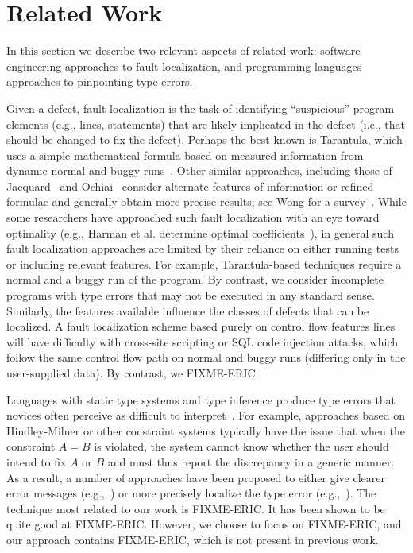 \section{Related Work}
\label{sec:related-work}

In this section we describe two relevant aspects of related work:
software engineering approaches to fault localization, and 
programming languages approaches to pinpointing type errors. 

Given a defect, fault localization is the task of identifying
``suspicious'' program elements (e.g., lines, statements) that are likely
implicated in the defect (i.e., that should be changed to fix the defect). 
Perhaps the best-known is Tarantula, which uses a simple mathematical
formula based on measured information from dynamic normal and buggy
runs~\cite{FIXME}. Other similar approaches, including those of
Jacquard~\cite{FIXME} and Ochiai~\cite{FIXME} consider alternate features
of information or refined formulae and generally obtain more precise
results; see Wong for a survey~\cite{FIXME}. While some researchers have
approached such fault localization with an eye toward optimality (e.g.,
Harman et al. determine optimal coefficients~\cite{FIXME}), in general
such fault localization approaches are limited by their reliance on either
running tests or including relevant features. For example, Tarantula-based 
techniques require a normal and a buggy run of the program. By contrast,
we consider incomplete programs with type errors that may not be executed
in any standard sense. Similarly, the features available influence the
classes of defects that can be localized. A fault localization scheme based
purely on control flow features lines will have difficulty with cross-site
scripting or SQL code injection attacks, which follow the same control flow
path on normal and buggy runs (differing only in the user-supplied data).
By contrast, we FIXME-ERIC.

Languages with static type systems and type inference produce type errors
that novices often perceive as difficult to interpret~\cite{FIXME}.  For
example, approaches based on Hindley-Milner or other constraint systems 
typically have the issue that when the constraint $A=B$ is violated, 
the system cannot know whether the user should intend to fix $A$ or $B$ and
must thus report the discrepancy in a generic manner. As a result, a number
of approaches have been proposed to either give clearer error messages
(e.g.,~\cite{FIXME}) or more precisely localize the type error
(e.g.,~\cite{FIXME}). The technique most related to our work is FIXME-ERIC. 
It has been shown to be quite good at FIXME-ERIC. However, we choose to 
focus on FIXME-ERIC, and our approach contains FIXME-ERIC, which is not
present in previous work. 

